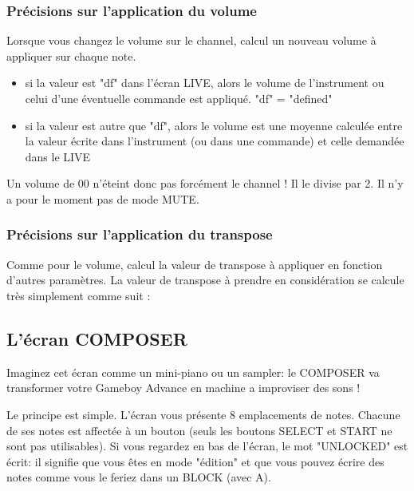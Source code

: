 \documentclass[12pt,a4paper]{article}
\begin{document}
    \subsubsection{Précisions sur l'application du volume}

    Lorsque vous changez le volume sur le channel, \FAT calcul un nouveau volume à appliquer sur chaque note.
    \medskip

    \begin{itemize}
        \item{si la valeur est "df" dans l'écran LIVE, alors le volume de l'instrument ou celui d'une éventuelle commande est appliqué. "df" = "defined"}
        \item{si la valeur est autre que "df", alors le volume est une moyenne calculée entre la valeur écrite dans l'instrument (ou dans une commande) et celle demandée dans le LIVE}
    \end{itemize}
    \medskip

    Un volume de 00 n'éteint donc pas forcément le channel ! Il le divise par 2.
    Il n'y a pour le moment pas de mode MUTE.


    \subsubsection{Précisions sur l'application du transpose}

    Comme pour le volume, \FAT calcul la valeur de transpose à appliquer en fonction d'autres paramètres.
    La valeur de transpose à prendre en considération se calcule très simplement comme suit :


    \subsection{L'écran COMPOSER}
    
    Imaginez cet écran comme un mini-piano ou un sampler: le COMPOSER va transformer votre Gameboy Advance en machine a improviser des sons !
    
    
    Le principe est simple.
    L'écran vous présente 8 emplacements de notes.
    Chacune de ses notes est affectée à un bouton (seuls les boutons SELECT et START ne sont pas utilisables).
    Si vous regardez en bas de l'écran, le mot "UNLOCKED" est écrit:
        il signifie que vous êtes en mode "édition" et que vous pouvez écrire des notes comme vous le feriez dans un BLOCK (avec A).
    \medskip
    
\end{document}
